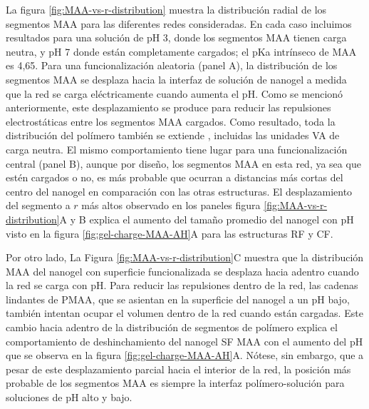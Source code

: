 La figura \ref{fig:MAA-vs-r-distribution} muestra la distribuci\'on radial de los segmentos MAA para las diferentes redes consideradas.
En cada caso incluimos resultados para una solución de pH 3, donde los segmentos MAA tienen carga neutra, y pH 7 donde est\'an completamente cargados;
el pKa intr\'inseco de MAA es 4,65.
Para una funcionalizaci\'on aleatoria (panel A), la distribuci\'on de los segmentos MAA se desplaza hacia la interfaz de soluci\'on de nanogel a medida que la red se carga el\'ectricamente cuando aumenta el pH.
Como se mencion\'o anteriormente, este desplazamiento se produce para reducir las repulsiones electrost\'aticas entre los segmentos MAA cargados.
Como resultado, toda la distribuci\'on del pol\'imero tambi\'en se extiende %
, incluidas las unidades VA de carga neutra.
El mismo comportamiento tiene lugar para una funcionalizaci\'on central (panel B),
aunque por dise\~no, los segmentos MAA en esta red, ya sea que est\'en cargados o no, es m\'as probable que ocurran a distancias m\'as cortas del centro del nanogel en comparaci\'on con las otras estructuras.
El desplazamiento del segmento a $r$ m\'as altos observado en los paneles figura \ref{fig:MAA-vs-r-distribution}A y B explica el aumento del tama\~no promedio del nanogel con pH visto en la figura \ref{fig:gel-charge-MAA-AH}A para las estructuras RF y CF.


Por otro lado,
La Figura \ref{fig:MAA-vs-r-distribution}C muestra que la distribuci\'on MAA del nanogel con superficie funcionalizada se desplaza hacia adentro cuando la red se carga con pH.
Para reducir las repulsiones dentro de la red, las cadenas lindantes de PMAA, que se asientan en la superficie del nanogel a un pH bajo, tambi\'en intentan ocupar el volumen dentro de la red cuando están cargadas.
Este cambio hacia adentro de la distribuci\'on de segmentos de pol\'imero %
explica el comportamiento de deshinchamiento del nanogel SF MAA con el aumento del pH que se observa en la figura \ref{fig:gel-charge-MAA-AH}A.
N\'otese, sin embargo, que a pesar de este desplazamiento parcial hacia el interior de la red, la posici\'on m\'as probable de los segmentos MAA es siempre la interfaz pol\'imero-soluci\'on para soluciones de pH alto y bajo.



